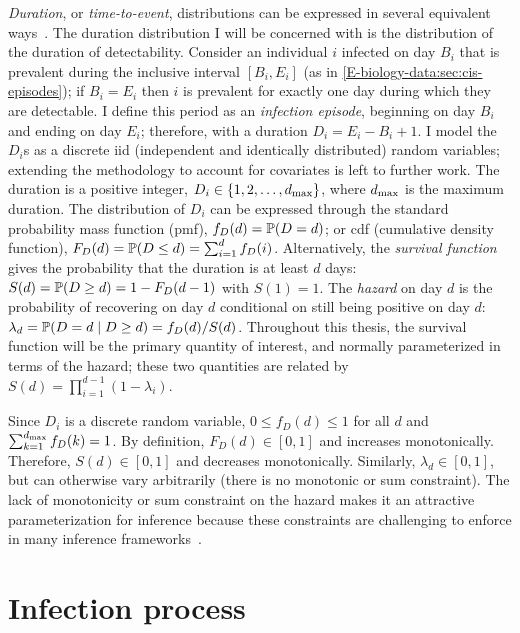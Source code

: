 \documentclass[thesis.tex]{subfiles}
\begin{document}
\emph{Duration}, or \emph{time-to-event}, distributions can be expressed in several equivalent ways~\autocite[17]{sunStatisticala}.
The duration distribution I will be concerned with is the distribution of the duration of detectability.
Consider an individual $i$ infected on day $B_i$ that is prevalent during the inclusive interval $[B_i, E_i]$ (as in \cref{E-biology-data:sec:cis-episodes}); if $B_i = E_i$ then $i$ is prevalent for exactly one day during which they are detectable.
I define this period as an \emph{infection episode}, beginning on day $B_i$ and ending on day $E_i$; therefore, with a duration $D_i = E_i - B_i + 1$.
I model the $D_i$s as a discrete iid (independent and identically distributed) random variables; extending the methodology to account for covariates is left to further work.
The duration is a positive integer, \ie $D_i \in \{1, 2, \dots, d_\text{max} \}$, where $d_\text{max}$ is the maximum duration.
The distribution of $D_i$ can be expressed through the standard probability mass function (pmf), $f_{D}(d) = \operatorname{\mathbb{P}}(D = d)$; or cdf (cumulative density function), $F_{D}(d) = \operatorname{\mathbb{P}}(D \leq d) = \sum_{i=1}^d f_{D}(i)$.
Alternatively, the \emph{survival function} gives the probability that the duration is at least $d$ days: $S(d) = \operatorname{\mathbb{P}}(D \geq d) = 1 - F_{D}(d - 1)$ with $S(1) = 1$.
The \emph{hazard} on day $d$ is the probability of recovering on day $d$ conditional on still being positive on day $d$: $\lambda_{d} = \operatorname{\mathbb{P}}(D = d \mid D \geq d) = f_{D}(d) / S(d)$.
Throughout this thesis, the survival function will be the primary quantity of interest, and normally parameterized in terms of the hazard; these two quantities are related by $S(d) = \prod_{i=1}^{d-1} (1 - \lambda_{i})$.

Since $D_i$ is a discrete random variable, $0 \leq f_D(d) \leq 1$ for all $d$ and $\sum_{k=1}^{d_\text{max}} f_D(k) = 1$.
By definition, $F_D(d) \in [0, 1]$ and increases monotonically.
Therefore, $S(d) \in [0, 1]$ and decreases monotonically.
Similarly, $\lambda_{d} \in [0,1]$, but can otherwise vary arbitrarily (\ie there is no monotonic or sum constraint).
The lack of monotonicity or sum constraint on the hazard makes it an attractive parameterization for inference because these constraints are challenging to enforce in many inference frameworks~\autocite{heBayesian}.

\section{Infection process} \label{inc-prev:sec:infection-process}
\end{document}
